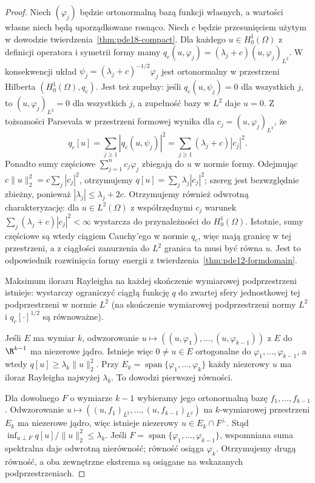 \begin{proof}
Niech $(\varphi_j)$ będzie ortonormalną bazą funkcji
własnych, a wartości własne niech będą uporządkowane rosnąco.
Niech $c$ będzie przesunięciem użytym w dowodzie
twierdzenia~\ref{thm:pde18-compact}. Dla każdego
$u\in H_0^1(\Omega)$ z definicji operatora i symetrii formy
mamy $q_c(u,\varphi_j)=(\lambda_j+c)(u,\varphi_j)_{L^2}$.
W konsekwencji układ
$\psi_j=(\lambda_j+c)^{-1/2}\varphi_j$ jest ortonormalny
w przestrzeni Hilberta $(H_0^1(\Omega),q_c)$.
Jest też zupełny: jeśli $q_c(u,\psi_j)=0$ dla wszystkich
$j$, to $(u,\varphi_j)_{L^2}=0$ dla wszystkich $j$,
a zupełność bazy w $L^2$ daje $u=0$.
Z tożsamości Parsevala w przestrzeni formowej wynika
dla $c_j=(u,\varphi_j)_{L^2}$, że
\[
 q_c[u]=\sum_{j\ge1}|q_c(u,\psi_j)|^2
       =\sum_{j\ge1}(\lambda_j+c)|c_j|^2.
\]
Ponadto sumy częściowe $\sum_{j=1}^n c_j\varphi_j$
zbiegają do $u$ w normie formy. Odejmując
$c\|u\|_2^2=c\sum_j|c_j|^2$, otrzymujemy
$q[u]=\sum_j\lambda_j|c_j|^2$; szereg jest bezwzględnie
zbieżny, ponieważ $|\lambda_j|\le\lambda_j+2c$.
Otrzymujemy również odwrotną charakteryzację:
dla $u\in L^2(\Omega)$ z współrzędnymi $c_j$ warunek
$\sum_j(\lambda_j+c)|c_j|^2<\infty$ wystarcza do
przynależności do $H_0^1(\Omega)$. Istotnie, sumy
częściowe są wtedy ciągiem Cauchy'ego w normie $q_c$,
więc mają granicę w tej przestrzeni, a z ciągłości
zanurzenia do $L^2$ granica ta musi być równa $u$.
Jest to odpowiednik rozwinięcia formy energii
z twierdzenia~\ref{thm:pde12-formdomain}.

Maksimum ilorazu Rayleigha na każdej skończenie wymiarowej
podprzestrzeni istnieje: wystarczy ograniczyć ciągłą
funkcję $q$ do zwartej sfery jednostkowej tej podprzestrzeni
w normie $L^2$ (na skończenie wymiarowej podprzestrzeni
normy $L^2$ i $q_c[\cdot]^{1/2}$ są równoważne).

Jeśli $E$ ma wymiar $k$, odwzorowanie
$u\mapsto((u,\varphi_1),\ldots,(u,\varphi_{k-1}))$
z $E$ do $\R^{k-1}$ ma niezerowe jądro. Istnieje więc
$0\ne u\in E$ ortogonalne do $\varphi_1,\ldots,
\varphi_{k-1}$, a wtedy $q[u]\ge\lambda_k\|u\|_2^2$.
Przy $E_k=\operatorname{span}\{\varphi_1,\ldots,\varphi_k\}$
każdy niezerowy $u$ ma iloraz Rayleigha najwyżej
$\lambda_k$. To dowodzi pierwszej równości.

Dla dowolnego $F$ o wymiarze $k-1$ wybieramy jego
ortonormalną bazę $f_1,\ldots,f_{k-1}$. Odwzorowanie
$u\mapsto((u,f_1)_{L^2},\ldots,(u,f_{k-1})_{L^2})$
na $k$-wymiarowej przestrzeni $E_k$ ma niezerowe jądro,
więc istnieje niezerowy $u\in E_k\cap F^\perp$. Stąd
$\inf_{u\perp F}q[u]/\|u\|_2^2\le\lambda_k$.
Jeśli $F=\operatorname{span}\{\varphi_1,\ldots,
\varphi_{k-1}\}$, wspomniana suma spektralna daje
odwrotną nierówność; równość osiąga $\varphi_k$.
Otrzymujemy drugą równość, a oba zewnętrzne ekstrema
są osiągane na wskazanych podprzestrzeniach.
\end{proof}


